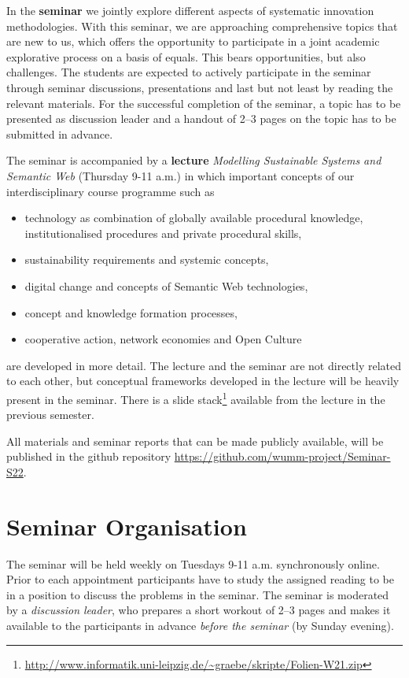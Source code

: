 \documentclass[11pt,a4paper]{article}
\begin{document}
In the \textbf{seminar} we jointly explore different aspects of systematic
innovation methodologies.  With this seminar, we are approaching comprehensive
topics that are new to us, which offers the opportunity to participate in a
joint academic explorative process on a basis of equals. This bears
opportunities, but also challenges.  The students are expected to actively
participate in the seminar through seminar discussions, presentations and last
but not least by reading the relevant materials.  For the successful
completion of the seminar, a topic has to be presented as discussion leader
and a handout of 2--3 pages on the topic has to be submitted in advance.

The seminar is accompanied by a \textbf{lecture} \emph{Modelling Sustainable
  Systems and Semantic Web} (Thursday 9-11 a.m.) in which important concepts
of our interdisciplinary course programme such as
\begin{itemize}[noitemsep]
\item technology as combination of globally available procedural knowledge,
  institutionalised procedures and private procedural skills, 
\item sustainability requirements and systemic concepts,
\item digital change and concepts of Semantic Web technologies,
\item concept and knowledge formation processes,
\item cooperative action, network economies and Open Culture
\end{itemize}
are developed in more detail. The lecture and the seminar are not directly
related to each other, but conceptual frameworks developed in the lecture will
be heavily present in the seminar. There is a slide
stack\footnote{\url{http://www.informatik.uni-leipzig.de/~graebe/skripte/Folien-W21.zip}}
available from the lecture in the previous semester.

All materials and seminar reports that can be made publicly available, will be
published in the github repository
\url{https://github.com/wumm-project/Seminar-S22}.

\section{Seminar Organisation}

The seminar will be held weekly on Tuesdays 9-11 a.m.  synchronously online.
Prior to each appointment participants have to study the assigned reading to
be in a position to discuss the problems in the seminar.  The seminar is
moderated by a \emph{discussion leader}, who prepares a short workout of 2--3
pages and makes it available to the participants in advance \emph{before the
  seminar} (by Sunday evening).
\end{document}
